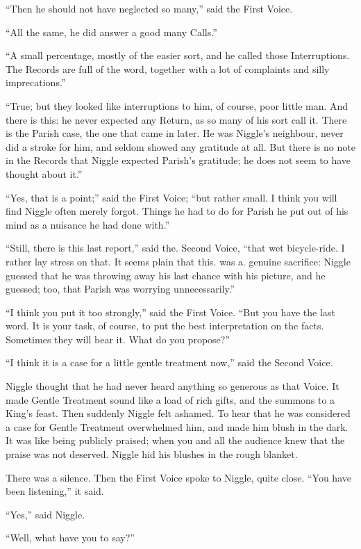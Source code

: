 \documentclass[english]{scrartcl}
\begin{document}
“Then he should not have neglected so many,” said the First Voice.

“All the same, he did answer a good many Calls.”

“A small percentage, mostly of the easier sort, and he called those Interruptions. The Records are full of the word, together with a lot of complaints and silly imprecations.”

“True; but they looked like interruptions to him, of course, poor little man. And there is this: he never expected any Return, as so many of his sort call it. There is the Parish case, the one that came in later. He was Niggle’s neighbour, never did a stroke for him, and seldom showed any gratitude at all. But there is no note in the Records that Niggle expected Parish’s gratitude; he does not seem to have thought about it.”

“Yes, that is a point;” said the First Voice; “but rather small. I think you will find Niggle often merely forgot. Things he had to do for Parish he put out of his mind as a nuisance he had done with.”

“Still, there is this last report,” said the. Second Voice, “that wet bicycle-ride. I rather lay stress on that. It seems plain that this. was a. genuine sacrifice: Niggle guessed that he was throwing away his last chance with his picture, and he guessed; too, that Parish was worrying unnecessarily.”

“I think you put it too strongly,” said the First Voice. “But you have the last word. It is your task, of course, to put the best interpretation on the facts. Sometimes they will bear it. What do you propose?”

“I think it is a case for a little gentle treatment now,” said the Second Voice.

Niggle thought that he had never heard anything so generous as that Voice. It made Gentle Treatment sound like a load of rich gifts, and the summons to a King’s feast. Then suddenly Niggle felt ashamed. To hear that he was considered a case for Gentle Treatment overwhelmed him, and made him blush in the dark. It was like being publicly praised; when you and all the audience knew that the praise was not deserved. Niggle hid his blushes in the rough blanket.

There was a silence. Then the First Voice spoke to Niggle, quite close. “You have been listening,” it said.

“Yes,” said Niggle.

“Well, what have you to say?”
\end{document}
